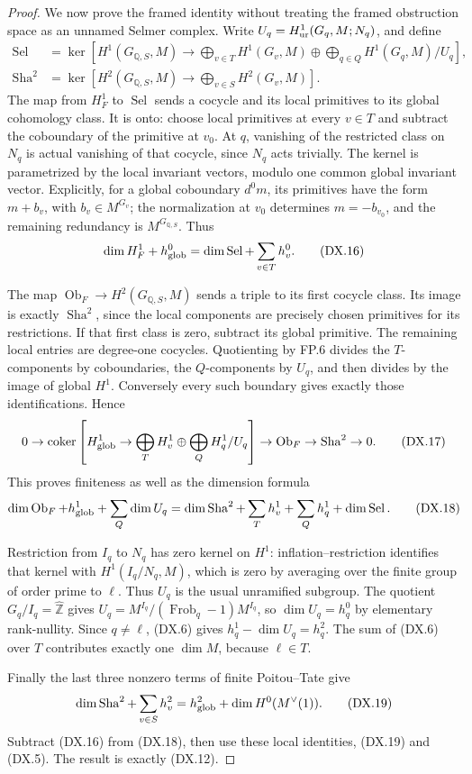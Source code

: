 \begin{proof}
We now prove the framed identity without treating the framed
obstruction space as an unnamed Selmer complex.
Write $U_q=H^1_{\rm ur}(G_q,M;N_q)$, and define
\[
 \begin{aligned}
 \operatorname{Sel}&=\ker\left[
 H^1(G_{\mathbb Q,S},M)\to
  \bigoplus_{v\in T}H^1(G_v,M)
       \oplus\bigoplus_{q\in Q}H^1(G_q,M)/U_q\right],\\
 \operatorname{Sha}^2&=\ker\left[
 H^2(G_{\mathbb Q,S},M)\to
                     \bigoplus_{v\in S}H^2(G_v,M)\right].
 \end{aligned}
 \tag{DX.15}
\]
The map from $H^1_F$ to $\operatorname{Sel}$ sends a cocycle
and its local primitives to its global cohomology class.
It is onto: choose local primitives at every $v\in T$ and
subtract the coboundary of the primitive at $v_0$.
At $q$, vanishing of the restricted class on $N_q$ is actual
vanishing of that cocycle, since $N_q$ acts trivially.
The kernel is parametrized by the local invariant vectors,
modulo one common global invariant vector.  Explicitly, for
a global coboundary $d^0m$, its primitives have the form
$m+b_v$, with $b_v\in M^{G_v}$; the normalization at $v_0$
determines $m=-b_{v_0}$, and the remaining redundancy is
$M^{G_{\mathbb Q,S}}$.  Thus
\[
 \dim H^1_F+h^0_{\rm glob}
             =\dim\operatorname{Sel}+\sum_{v\in T}h^0_v .
 \tag{DX.16}
\]

The map $\operatorname{Ob}_F\to H^2(G_{\mathbb Q,S},M)$
sends a triple to its first cocycle class.
Its image is exactly $\operatorname{Sha}^2$, since the local
components are precisely chosen primitives for its restrictions.
If that first class is zero, subtract its global primitive.
The remaining local entries are degree-one cocycles.
Quotienting by FP.6 divides the $T$-components by coboundaries,
the $Q$-components by $U_q$, and then divides by the image
of global $H^1$.  Conversely every such boundary gives
exactly those identifications.  Hence
\[
0\to\operatorname{coker}\left[
 H^1_{\rm glob}\to
 \bigoplus_T H^1_v\oplus\bigoplus_Q H^1_q/U_q\right]
 \to\operatorname{Ob}_F\to\operatorname{Sha}^2\to0 .
 \tag{DX.17}
\]
This proves finiteness as well as the dimension formula
\[
 \dim\operatorname{Ob}_F+h^1_{\rm glob}+\sum_Q\dim U_q
 =\dim\operatorname{Sha}^2+\sum_T h^1_v+\sum_Q h^1_q
                              +\dim\operatorname{Sel}.
 \tag{DX.18}
\]

Restriction from $I_q$ to $N_q$ has zero kernel on $H^1$:
inflation--restriction identifies that kernel with
$H^1(I_q/N_q,M)$, which is zero by averaging over the
finite group of order prime to $\ell$.
Thus $U_q$ is the usual unramified subgroup.
The quotient $G_q/I_q=\widehat{\mathbb Z}$ gives
$U_q=M^{I_q}/(\operatorname{Frob}_q-1)M^{I_q}$, so
$\dim U_q=h^0_q$ by elementary rank-nullity.
Since $q\ne\ell$, (DX.6) gives $h^1_q-\dim U_q=h^2_q$.
The sum of (DX.6) over $T$ contributes exactly one
$\dim M$, because $\ell\in T$.

Finally the last three nonzero terms of finite Poitou--Tate give
\[
 \dim\operatorname{Sha}^2+\sum_{v\in S}h^2_v
       =h^2_{\rm glob}+\dim H^0(M^\vee(1)).
 \tag{DX.19}
\]
Subtract (DX.16) from (DX.18), then use these local identities,
(DX.19) and (DX.5).  The result is exactly (DX.12).
\end{proof}

